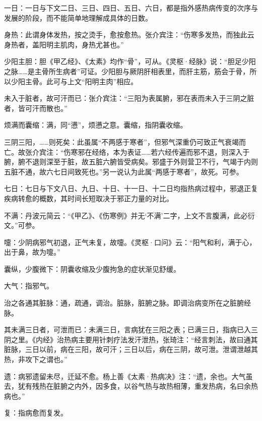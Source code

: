\documentclass[draft,12pt]{ctexbook}
\begin{document}

\begin{jiaozhu}
  \item 一日：一日与下文二日、三日、四日、五日、六日，都是指外感热病传变的次序与发展的阶段，而不能简单地理解成具体的日数。
  \item 身热：此谓身体发热，按之烫手，愈按愈热。张介宾注：“伤寒多发热，而独此云身热者，盖阳明主肌肉，身热尤甚也。”
  \item 少阳主胆：胆《甲乙经》、《太素》均作“骨”，可从。《灵枢·经脉》说：“胆足少阳之脉……是主骨所生病者”可证。少阳胆与厥阴肝相表里，而肝主筋，筋会于骨，所以少阳主骨。此可与上文“阳明主肉”相应。
  \item 未入于脏者，故可汗而已：张介宾注：“三阳为表属腑，邪在表而未入于三阴之脏者，皆可汗而散也。”
  \item 烦满而囊缩：满，同“懑”，烦懑之意。囊缩，指阴囊收缩。
  \item 三阴三阳，……则死矣：此虽属“不两感于寒者”，但邪气深重仍可致正气衰竭而亡。故张介宾注：“伤寒邪在经络，本为表证……若六经传遍而邪不退，则深入于腑，腑不退则深至于脏，故五脏六腑皆受病矣。邪盛于外则营卫不行，气竭于内则五脏不通，故六七日间致死也。”另一说认为此属“两感于寒者”，故死。可参。
  \item 七日：七日与下文八日、九日、十日、十一日、十二日均指热病过程中，邪退正复疾病转愈的概数，其时间长短取决于邪正力量的对比。
  \item 不满：丹波元简云：“《甲乙》、《伤寒例》并无‘不满’二字，上文不言腹满，此必衍文。”可参。
  \item 嚏：少阴病邪气初退，正气未复，故嚏。《灵枢·口问》云：“阳气和利，满于心，出于鼻，故为嚏。”
  \item 囊纵，少腹微下：阴囊收缩及少腹拘急的症状渐见舒缓。
  \item 大气：指邪气。
  \item 治之各通其脏脉：通，疏通，调治。脏脉，脏腑之脉。即调治病变所在之脏腑经脉。
  \item 其未满三日者，可泄而已：未满三日，言病犹在三阳之表；已满三日，指病已入三阴之里。《内经》治热病主要用针刺疗法发汗泄热，张琦注：“经言刺法，故曰通其脏脉，三日以前，病在三阳，故可汗；三日以后，病在三阴，故可泄。泄谓泄越其热，非攻下之谓也。”
  \item 遗：病邪遗留未尽，迁延不愈。杨上善《太素·热病决》注：“遗，余也。大气虽去，犹有残热在脏腑之内外，因多食，以谷气热与故热相薄，重发热病，名曰余热病也。”
  \item 复：指病愈而复发。
\end{jiaozhu}
\end{document}
